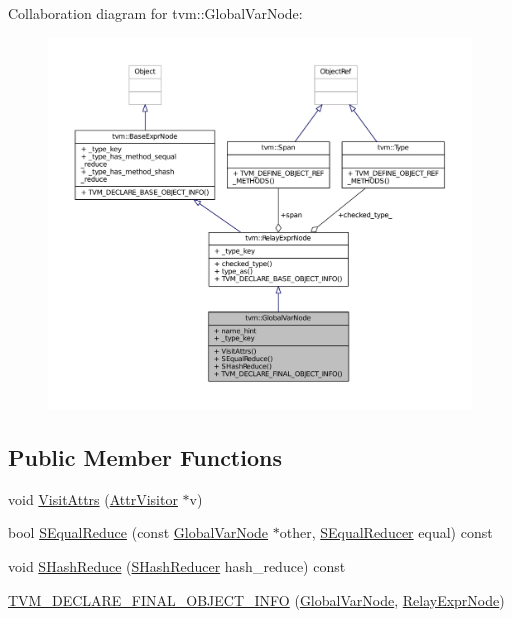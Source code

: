 Collaboration diagram for tvm\+:\+:Global\+Var\+Node\+:
\nopagebreak
\begin{figure}[H]
\begin{center}
\leavevmode
\includegraphics[width=350pt]{classtvm_1_1GlobalVarNode__coll__graph}
\end{center}
\end{figure}
\subsection*{Public Member Functions}
\begin{DoxyCompactItemize}
\item 
void \hyperlink{classtvm_1_1GlobalVarNode_a903642f4abfde8fccc0144f97a25751e}{Visit\+Attrs} (\hyperlink{classtvm_1_1AttrVisitor}{Attr\+Visitor} $\ast$v)
\item 
bool \hyperlink{classtvm_1_1GlobalVarNode_a17a31708458fb8db6a02c26490718cef}{S\+Equal\+Reduce} (const \hyperlink{classtvm_1_1GlobalVarNode}{Global\+Var\+Node} $\ast$other, \hyperlink{classtvm_1_1SEqualReducer}{S\+Equal\+Reducer} equal) const 
\item 
void \hyperlink{classtvm_1_1GlobalVarNode_afe504b71e30d8ceb2f0e69249c970080}{S\+Hash\+Reduce} (\hyperlink{classtvm_1_1SHashReducer}{S\+Hash\+Reducer} hash\+\_\+reduce) const 
\item 
\hyperlink{classtvm_1_1GlobalVarNode_a354134884e5c5cd7277287457e1d09e2}{T\+V\+M\+\_\+\+D\+E\+C\+L\+A\+R\+E\+\_\+\+F\+I\+N\+A\+L\+\_\+\+O\+B\+J\+E\+C\+T\+\_\+\+I\+N\+FO} (\hyperlink{classtvm_1_1GlobalVarNode}{Global\+Var\+Node}, \hyperlink{classtvm_1_1RelayExprNode}{Relay\+Expr\+Node})
\end{DoxyCompactItemize}
